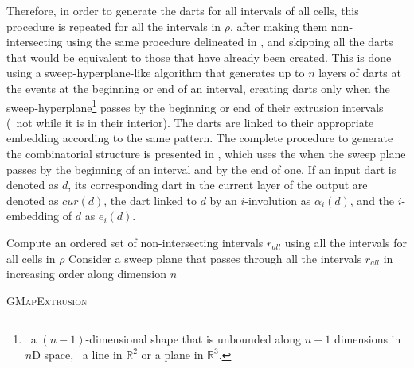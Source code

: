 Therefore, in order to generate the darts for all intervals of all cells, this procedure is repeated for all the intervals in $\rho$, after making them non-intersecting using the same procedure delineated in , and skipping all the darts that would be equivalent to those that have already been created.
This is done using a sweep-hyperplane-like algorithm that generates up to $n$ layers of darts at the events at the beginning or end of an interval, creating darts only when the sweep-hyperplane\footnote{\ie\ a $(n-1)$-dimensional shape that is unbounded along $n-1$ dimensions in $n$D space, \eg\ a line in $\mathbb{R}^2$ or a plane in $\mathbb{R}^3$.} passes by the beginning or end of their extrusion intervals (\ie\ not while it is in their interior).
The darts are linked to their appropriate embedding according to the same pattern.
The complete procedure to generate the combinatorial structure is presented in , which uses the  when the sweep plane passes by the beginning of an interval and  by the end of one.
If an input dart is denoted as $d$, its corresponding dart in the current layer of the output are denoted as $cur(d)$, the dart linked to $d$ by an $i$-involution as $\alpha_{i}(d)$, and the $i$-embedding of $d$ as $e_{i}(d)$.

\begin{algorithm}[tb]
\small
{}
\DontPrintSemicolon{}
Compute an ordered set of non-intersecting intervals $r_{all}$ using all the intervals for all cells in $\rho$ \;
Consider a sweep plane that passes through all the intervals $r_{all}$ in increasing order along dimension $n$ \;
\caption{\textsc{GMapExtrusion}}\label{algo:gmapextrusion}
\end{algorithm}

